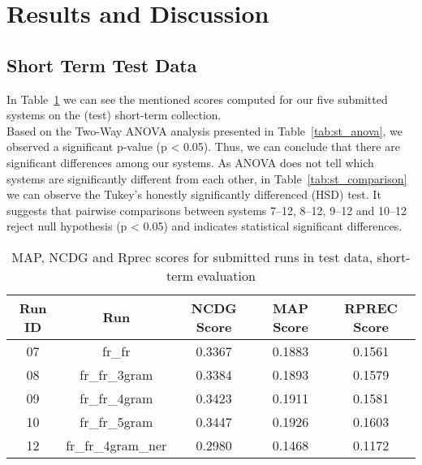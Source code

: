 \newpage
\section{Results and Discussion}
\label{sec:results}

\subsection{Short Term Test Data}\label{subsec:short_term}

In Table~\ref{tab:st_scores} we can see the mentioned scores computed for our five submitted systems on the (test)
short-term collection.\\

Based on the Two-Way ANOVA analysis presented in Table~\ref{tab:st_anova}, we observed a significant p-value (p < 0.05).
Thus, we can conclude that there are significant differences among our systems.
As ANOVA does not tell which systems are significantly different from each other, in Table~\ref{tab:st_comparison} we
can observe the Tukey’s honestly significantly differenced (HSD) test.
It suggests that pairwise comparisons between systems 7--12, 8--12, 9--12 and 10--12 reject null hypothesis (p < 0.05)
and indicates statistical significant differences.

\begin{table}[h!]
    \begin{center}
        \caption{MAP, NCDG and Rprec scores for submitted runs in test data, short-term evaluation}
        \label{tab:st_scores}
        \begin{tabular}{|c|c||c|c|c|}
            \hline
            \textbf{Run ID} & \textbf{Run} & \textbf{NCDG Score} & \textbf{MAP Score} & \textbf{RPREC Score}\\
            \hline\hline
            07 & fr\_fr & 0.3367 & 0.1883 & 0.1561 \\
            \hline
            08 & fr\_fr\_3gram & 0.3384 & 0.1893 & 0.1579 \\
            \hline
            09 & fr\_fr\_4gram & 0.3423 & 0.1911 & 0.1581 \\
            \hline
            10 & fr\_fr\_5gram & 0.3447 & 0.1926 & 0.1603 \\
            \hline
            12 & fr\_fr\_4gram\_ner & 0.2980 & 0.1468 & 0.1172 \\
            \hline
        \end{tabular}
    \end{center}
\end{table}

